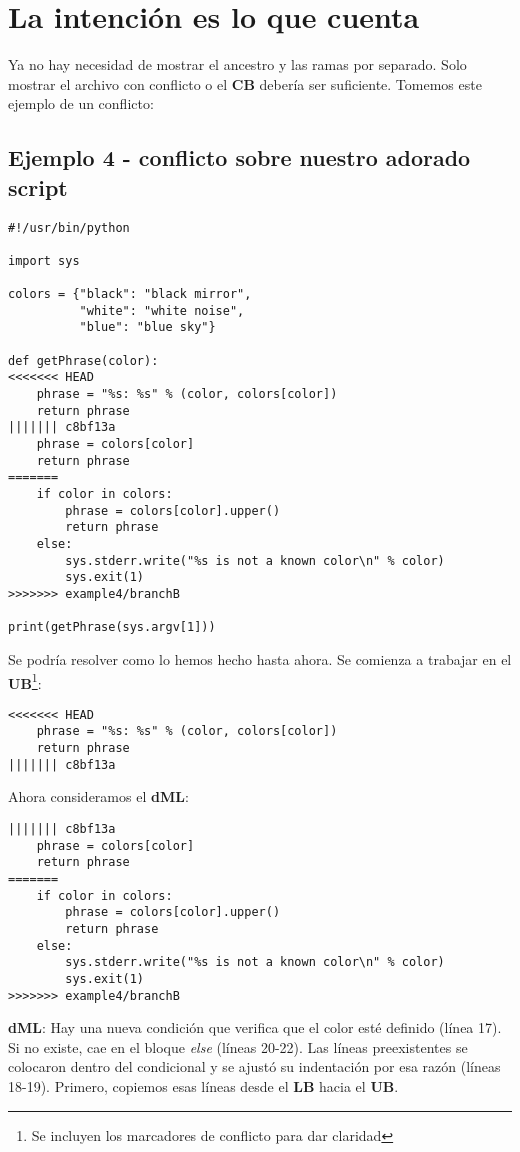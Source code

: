 
\section{La intención es lo que cuenta}
\label{intent}
Ya no hay necesidad de mostrar el ancestro y las ramas por separado. Solo mostrar el archivo con conflicto
o el {\bf CB} debería ser suficiente. Tomemos este ejemplo de un conflicto:

\subsection{Ejemplo 4 - conflicto sobre nuestro adorado script}
\label{example_04}

\begin{lstlisting}[style=python_style, caption={\bf Ejemplo 4}]
#!/usr/bin/python

import sys

colors = {"black": "black mirror",
          "white": "white noise",
          "blue": "blue sky"}

def getPhrase(color):
<<<<<<< HEAD
    phrase = "%s: %s" % (color, colors[color])
    return phrase
||||||| c8bf13a
    phrase = colors[color]
    return phrase
=======
    if color in colors:
        phrase = colors[color].upper()
        return phrase
    else:
        sys.stderr.write("%s is not a known color\n" % color)
        sys.exit(1)
>>>>>>> example4/branchB

print(getPhrase(sys.argv[1]))
\end{lstlisting}

Se podría resolver como lo hemos hecho hasta ahora. Se comienza a trabajar en el {\bf UB}\footnote{Se incluyen
los marcadores de conflicto para dar claridad}:
\begin{lstlisting}[style=python_style, firstnumber=10, caption={\bf Ejemplo 4} - Paso 1 - UB]
<<<<<<< HEAD
    phrase = "%s: %s" % (color, colors[color])
    return phrase
||||||| c8bf13a
\end{lstlisting}

Ahora consideramos el {\bf dML}:
\begin{lstlisting}[style=python_style, firstnumber=13, caption={\bf Ejemplo 4} - Paso 2 - dML]
||||||| c8bf13a
    phrase = colors[color]
    return phrase
=======
    if color in colors:
        phrase = colors[color].upper()
        return phrase
    else:
        sys.stderr.write("%s is not a known color\n" % color)
        sys.exit(1)
>>>>>>> example4/branchB
\end{lstlisting}
{\bf dML}: Hay una nueva condición que verifica que el color esté definido (línea 17). Si no existe, cae en el bloque {\it else}
(líneas 20-22). Las líneas preexistentes se colocaron dentro del condicional y se ajustó su indentación por esa razón (líneas
18-19). Primero, copiemos esas líneas desde el {\bf LB} hacia el {\bf UB}.

